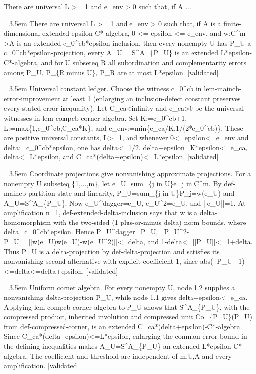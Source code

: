 \documentclass{article}
\newcommand{\step}[1]{\par\noindent\hangindent=3.5em\hangafter=1%
  \makebox[3.5em][l]{\textbf{#1.}}}
\newcommand{\steptag}[1]{\hfill{\small\textsf{[#1]}}}
\begin{document}
\begin{proofbox}{There are universal L >= 1 and e\_env > 0 such that, if A ...}
\step{1} There are universal L >= 1 and e\_env > 0 such that, if A is a finite-dimensional extended epsilon-C*-algebra, 0 <= epsilon <= e\_env, and w:C\textasciicircum{}m->A is an extended c\_0\textasciicircum{}cb*epsilon-inclusion, then every nonempty U has P\_U a c\_0\textasciicircum{}cb*epsilon-projection, every A\_U = S\textasciicircum{}A\_\{P\_U\} is an extended L*epsilon-C*-algebra, and for U subseteq R all subordination and complementarity errors among P\_U, P\_\{R minus U\}, P\_R are at most L*epsilon. \steptag{validated} \\[6pt]
\step{1.1} Universal constant ledger. Choose the witness c\_0\textasciicircum{}cb in lem-maincb-error-improvement at least 1 (enlarging an inclusion-defect constant preserves every stated error inequality). Let C\_ca<infinity and e\_ca>0 be the universal witnesses in lem-compcb-corner-algebra. Set K:=c\_0\textasciicircum{}cb+1, L:=max\{1,c\_0\textasciicircum{}cb,C\_ca*K\}, and e\_env:=min\{e\_ca/K,1/(2*c\_0\textasciicircum{}cb)\}. These are positive universal constants, L>=1, and whenever 0<=epsilon<=e\_env and delta:=c\_0\textasciicircum{}cb*epsilon, one has delta<=1/2, delta+epsilon=K*epsilon<=e\_ca, delta<=L*epsilon, and C\_ca*(delta+epsilon)<=L*epsilon. \steptag{validated} \\[4pt]
\step{1.2} Coordinate projections give nonvanishing approximate projections. For a nonempty U subseteq \{1,...,m\}, let e\_U=sum\_\{j in U\}e\_j in C\textasciicircum{}m. By def-maincb-partition-state and linearity, P\_U=sum\_\{j in U\}P\_j=w(e\_U) and A\_U=S\textasciicircum{}A\_\{P\_U\}. Now e\_U\textasciicircum{}dagger=e\_U, e\_U\textasciicircum{}2=e\_U, and ||e\_U||=1. At amplification n=1, def-extended-delta-inclusion says that w is a delta-homomorphism with the two-sided (1 plus-or-minus delta) norm bounds, where delta=c\_0\textasciicircum{}cb*epsilon. Hence P\_U\textasciicircum{}dagger=P\_U, ||P\_U\textasciicircum{}2-P\_U||=||w(e\_U)w(e\_U)-w(e\_U\textasciicircum{}2)||<=delta, and 1-delta<=||P\_U||<=1+delta. Thus P\_U is a delta-projection by def-delta-projection and satisfies its nonvanishing second alternative with explicit coefficient 1, since abs(||P\_U||-1)<=delta<=delta+epsilon. \steptag{validated} \\[4pt]
\step{1.3} Uniform corner algebra. For every nonempty U, node 1.2 supplies a nonvanishing delta-projection P\_U, while node 1.1 gives delta+epsilon<=e\_ca. Applying lem-compcb-corner-algebra to P\_U shows that S\textasciicircum{}A\_\{P\_U\}, with the compressed product, inherited involution and compressed unit Co\_\{P\_U\}(P\_U) from def-compressed-corner, is an extended C\_ca*(delta+epsilon)-C*-algebra. Since C\_ca*(delta+epsilon)<=L*epsilon, enlarging the common error bound in the defining inequalities makes A\_U=S\textasciicircum{}A\_\{P\_U\} an extended L*epsilon-C*-algebra. The coefficient and threshold are independent of m,U,A and every amplification. \steptag{validated} \\[4pt]

\end{proofbox}
\end{document}
